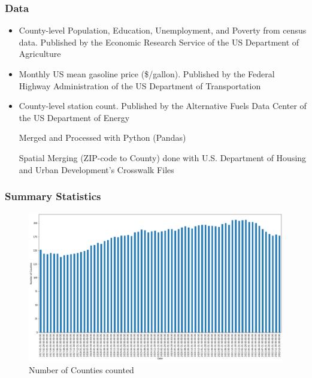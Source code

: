 \documentclass{beamer}
\begin{document}
\begin{frame}
\frametitle{Data}

\begin{itemize}
    \item {} County-level Population, Education, Unemployment, and Poverty from census data. Published by the Economic Research Service of the US Department of Agriculture
    \item {} Monthly US mean gasoline price (\$/gallon). Published by the Federal Highway Administration of the US Department of Transportation
    \item {} County-level station count. Published by the Alternative Fuels Data Center of the US Department of Energy

    \vspace{5mm}

    Merged and Processed with Python (Pandas)

    \vspace{5mm}

    Spatial Merging (ZIP-code to County) done with U.S. Department of Housing and Urban Development's Crosswalk Files 
    
\end{itemize}

\end{frame}

\begin{frame}
\frametitle{Summary Statistics}

\begin{figure}[!htb]
  \includegraphics[width=\textwidth]{countypop}
  \caption{Number of Counties counted}
\end{figure}
\end{frame}
\end{document}
